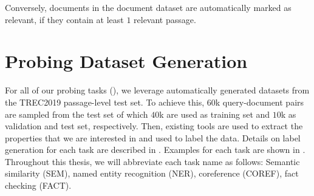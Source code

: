 Conversely, documents in the document dataset are automatically marked as relevant, if they contain at least $1$ relevant passage.

\section{Probing Dataset Generation}
\label{sec:dataset_gen}
For all of our probing tasks (), we leverage automatically generated datasets from the TREC2019 passage-level test set. To achieve this, $60$k query-document pairs are sampled from the test set of which $40$k are used as training set and $10$k as validation and test set, respectively. Then, existing tools are used to extract the properties that we are interested in and used to label the data. Details on label generation for each task are described in . Examples for each task are shown in . Throughout this thesis, we will abbreviate each task name as follows: Semantic similarity (SEM), named entity recognition (NER), coreference (COREF), fact checking (FACT).

